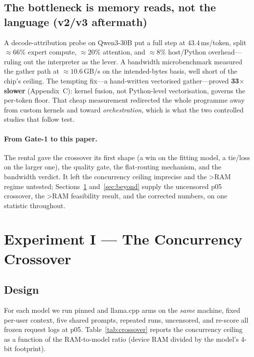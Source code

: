 \documentclass[11pt]{article}
\newcommand{\ppl}{\ensuremath{\times}}
\begin{document}
\subsection{The bottleneck is memory reads, not the language (v2/v3 aftermath)}
\label{sec:gate1diag}
A decode-attribution probe on Qwen3-30B put a full step at $43.4$\,ms/token, split
${\approx}66\%$ expert compute, ${\approx}20\%$ attention, and ${\approx}8\%$ host/Python
overhead---ruling out the interpreter as the lever. A bandwidth microbenchmark measured
the gather path at ${\approx}10.6$\,GB/s on the intended-bytes basis, well short of the
chip's ceiling. The tempting fix---a hand-written vectorised gather---proved \textbf{33\ppl
slower} (Appendix~C): kernel fusion, not Python-level vectorisation, governs the per-token
floor. That cheap measurement redirected the whole programme away from custom kernels and
toward \emph{orchestration}, which is what the two controlled studies that follow test.

\paragraph{From Gate-1 to this paper.} The rental gave the crossover its first shape
(a win on the fitting model, a tie/loss on the larger one), the quality gate, the
flat-routing mechanism, and the bandwidth verdict. It left the concurrency ceiling
imprecise and the >RAM regime untested; Sections~\ref{sec:crossover} and~\ref{sec:beyond}
supply the uncensored p05 crossover, the >RAM feasibility result, and the corrected
numbers, on one statistic throughout.

\section{Experiment I --- The Concurrency Crossover}
\label{sec:crossover}

\subsection{Design}
For each model we run pinned and llama.cpp arms on the \emph{same} machine, fixed
per-user context, five shared prompts, repeated runs, uncensored, and re-score all
frozen request logs at p05. Table~\ref{tab:crossover} reports the concurrency ceiling as
a function of the RAM-to-model ratio (device RAM divided by the model's 4-bit footprint).
\end{document}
